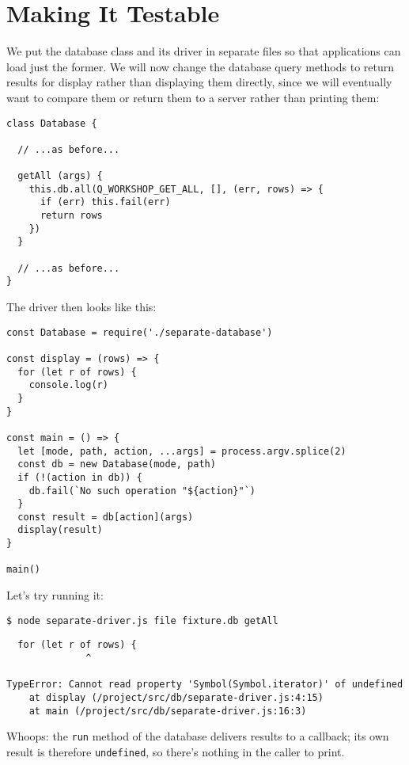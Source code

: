 \section{Making It Testable}\label{s:db-testable}

We put the database class and its driver in separate files
so that applications can load just the former.
We will now change the database query methods to return results for display
rather than displaying them directly,
since we will eventually want to compare them or return them to a server rather than printing them:

\begin{verbatim}
class Database {

  // ...as before...

  getAll (args) {
    this.db.all(Q_WORKSHOP_GET_ALL, [], (err, rows) => {
      if (err) this.fail(err)
      return rows
    })
  }

  // ...as before...
}
\end{verbatim}

The driver then looks like this:

\begin{verbatim}
const Database = require('./separate-database')

const display = (rows) => {
  for (let r of rows) {
    console.log(r)
  }
}

const main = () => {
  let [mode, path, action, ...args] = process.argv.splice(2)
  const db = new Database(mode, path)
  if (!(action in db)) {
    db.fail(`No such operation "${action}"`)
  }
  const result = db[action](args)
  display(result)
}

main()
\end{verbatim}

Let's try running it:

\begin{verbatim}
$ node separate-driver.js file fixture.db getAll
\end{verbatim}

\begin{verbatim}
  for (let r of rows) {
              ^

TypeError: Cannot read property 'Symbol(Symbol.iterator)' of undefined
    at display (/project/src/db/separate-driver.js:4:15)
    at main (/project/src/db/separate-driver.js:16:3)
\end{verbatim}

Whoops: the \texttt{run} method of the database delivers results to a callback;
its own result is therefore \texttt{undefined},
so there's nothing in the caller to print.

